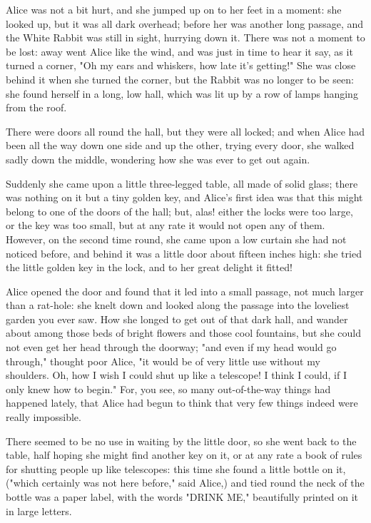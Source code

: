​Alice was not a bit hurt, and she jumped up on to her feet in a moment: she looked up, but it was all dark overhead; before her was another long passage, and the White Rabbit was still in sight, hurrying down it. There was not a moment to be lost: away went Alice like the wind, and was just in time to hear it say, as it turned a corner, "Oh my ears and whiskers, how late it's getting!" She was close behind it when she turned the corner, but the Rabbit was no longer to be seen: she found herself in a long, low hall, which was lit up by a row of lamps hanging from the roof.

There were doors all round the hall, but they were all locked; and when Alice had been all the way down one side and up the other, trying every door, she walked sadly down the middle, wondering how she was ever to get out again.

Suddenly she came upon a little three-legged table, all made of solid glass; there was nothing on it but a tiny golden key, and Alice's first idea was that this might belong to one of the ​doors of the hall; but, alas! either the locks were too large, or the key was too small, but at any rate it would not open any of them. However, on the second time round, she came upon a low curtain she had not noticed before, and behind it was a little door about fifteen inches high: she tried the little golden key in the lock, and to her great delight it fitted!

Alice opened the door and found that it led into a small passage, not much larger than a rat-hole: she knelt down and looked along the passage into the loveliest garden you ever saw. How she longed to get out of that dark hall, and wander about among those beds of bright ​flowers and those cool fountains, but she could not even get her head through the doorway; "and even if my head would go through," thought poor Alice, "it would be of very little use without my shoulders. Oh, how I wish I could shut up like a telescope! I think I could, if I only knew how to begin." For, you see, so many out-of-the-way things had happened lately, that Alice had begun to think that very few things indeed were really impossible.

There seemed to be no use in waiting by the little door, so she went back to the table, half hoping she might find another key on it, or at any rate a book of rules for shutting people up like telescopes: this time she found a little bottle on it, ("which certainly was not here before," said Alice,) and tied round the neck of the bottle was a paper label, with the words "DRINK ME," beautifully printed on it in large letters.

